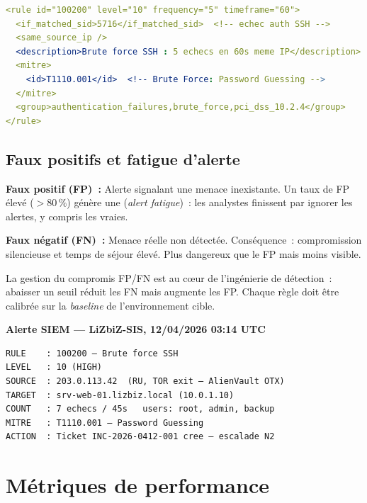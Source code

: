 \begin{lstlisting}[style=StyleCode, language=YAML,
  caption={Règle Wazuh --- brute force SSH, mapping MITRE ATT\&CK},
  label={lst:regle-ssh}]
<rule id="100200" level="10" frequency="5" timeframe="60">
  <if_matched_sid>5716</if_matched_sid>  <!-- echec auth SSH -->
  <same_source_ip />
  <description>Brute force SSH : 5 echecs en 60s meme IP</description>
  <mitre>
    <id>T1110.001</id>  <!-- Brute Force: Password Guessing -->
  </mitre>
  <group>authentication_failures,brute_force,pci_dss_10.2.4</group>
</rule>
\end{lstlisting}

\subsection{Faux positifs et fatigue d'alerte}

\begin{boxdef}
\textbf{Faux positif (FP)~:} Alerte signalant une menace inexistante.
Un taux de FP élevé ($>80\,\%$) génère une 
(\textit{alert fatigue})~: les analystes finissent par ignorer les alertes,
y compris les vraies.
\end{boxdef}

\begin{boxdef}
\textbf{Faux négatif (FN)~:} Menace réelle non détectée. Conséquence~:
compromission silencieuse et temps de séjour élevé. Plus dangereux que le FP
mais moins visible.
\end{boxdef}

La gestion du compromis FP/FN est au cœur de l'ingénierie de détection~:
abaisser un seuil réduit les FN mais augmente les FP. Chaque règle doit
être calibrée sur la \textit{baseline} de l'environnement cible.

\begin{boxsiem}
\textbf{Alerte SIEM --- LiZbiZ-SIS, 12/04/2026 03:14 UTC}
\begin{verbatim}
RULE    : 100200 — Brute force SSH
LEVEL   : 10 (HIGH)
SOURCE  : 203.0.113.42  (RU, TOR exit — AlienVault OTX)
TARGET  : srv-web-01.lizbiz.local (10.0.1.10)
COUNT   : 7 echecs / 45s   users: root, admin, backup
MITRE   : T1110.001 — Password Guessing
ACTION  : Ticket INC-2026-0412-001 cree — escalade N2
\end{verbatim}
\end{boxsiem}

\section{Métriques de performance}
\label{sec:soc-kpi}

